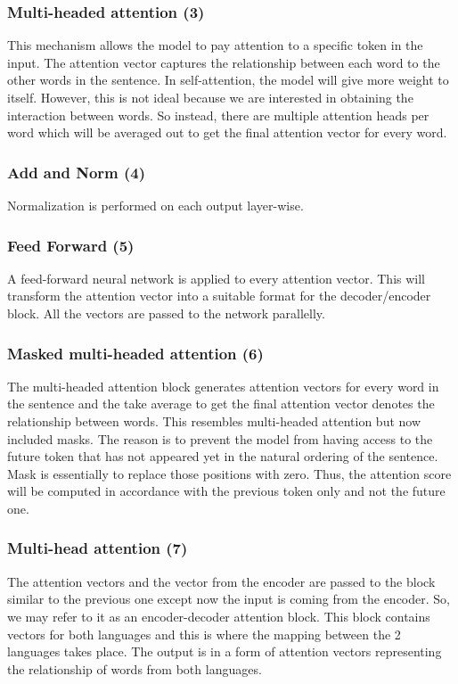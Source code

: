 \documentclass[12pt,oneside,openright,a4paper]{cpe-english-project}
\begin{document}
\subsubsection{Multi-headed attention (3)}
This mechanism allows the model to pay attention to a specific token in the input. The attention vector captures the relationship between each word to the other words in the sentence. In self-attention, the model will give more weight to itself. However, this is not ideal because we are interested in obtaining the interaction between words. So instead, there are multiple attention heads per word which will be averaged out to get the final attention vector for every word.

\subsubsection{Add and Norm (4)}
Normalization is performed on each output layer-wise.

\subsubsection{Feed Forward (5)}
A feed-forward neural network is applied to every attention vector. This will transform the attention vector into a suitable format for the decoder/encoder block. All the vectors are passed to the network parallelly.

\subsubsection{Masked multi-headed attention (6)}
The multi-headed attention block generates attention vectors for every word in the sentence and the take average to get the final attention vector denotes the relationship between words. This resembles multi-headed attention but now included masks.
The reason is to prevent the model from having access to the future token that has not appeared yet in the natural ordering of the sentence. Mask is essentially to replace those positions with zero. Thus, the attention score will be computed in accordance with the previous token only and not the future one. 

\subsubsection{Multi-head attention (7)}
The attention vectors and the vector from the encoder are passed to the block similar to the previous one except now the input is coming from the encoder. So, we may refer to it as an encoder-decoder attention block. This block contains vectors for both languages and this is where the mapping between the 2 languages takes place. The output is in a form of attention vectors representing the relationship of words from both languages. 
\end{document}
